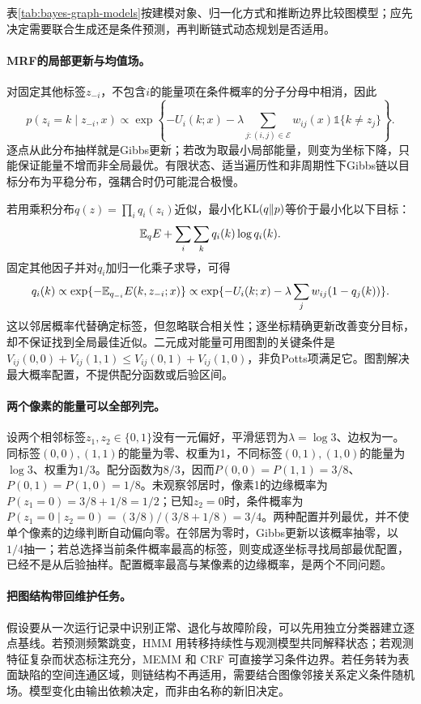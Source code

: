 表\ref{tab:bayes-graph-models}按建模对象、归一化方式和推断边界比较图模型；应先决定需要联合生成还是条件预测，再判断链式动态规划是否适用。
\paragraph{MRF的局部更新与均值场。}
对固定其他标签$z_{-i}$，不包含$i$的能量项在条件概率的分子分母中相消，因此
\begin{equation}
 p(z_i=k\mid z_{-i},x)\propto
 \exp\left\{-U_i(k;x)-\lambda\sum_{j:(i,j)\in\mathcal E}w_{ij}(x)\mathbb 1\{k\ne z_j\}\right\}.
\end{equation}
逐点从此分布抽样就是Gibbs更新；若改为取最小局部能量，则变为坐标下降，只能保证能量不增而非全局最优。有限状态、适当遍历性和非周期性下Gibbs链以目标分布为平稳分布，强耦合时仍可能混合极慢。

若用乘积分布$q(z)=\prod_iq_i(z_i)$近似，最小化$\operatorname{KL}(q\|p)$等价于最小化以下目标：
\begin{equation}
 \mathbb{E}_qE+\sum_i\sum_kq_i(k)\log q_i(k).
\end{equation}
固定其他因子并对$q_i$加归一化乘子求导，可得
\begin{equation}
 q_i(k)\propto\exp\{-\mathbb{E}_{q_{-i}}E(k,z_{-i};x)\}
 \propto\exp\{-U_i(k;x)-\lambda\sum_jw_{ij}(1-q_j(k))\}.
\end{equation}
这以邻居概率代替确定标签，但忽略联合相关性；逐坐标精确更新改善变分目标，却不保证找到全局最佳近似。二元成对能量可用图割的关键条件是$V_{ij}(0,0)+V_{ij}(1,1)\leq V_{ij}(0,1)+V_{ij}(1,0)$，非负Potts项满足它。图割解决最大概率配置，不提供配分函数或后验区间。

\paragraph{两个像素的能量可以全部列完。}
设两个相邻标签$z_1,z_2\in\{0,1\}$没有一元偏好，平滑惩罚为$\lambda=\log3$、边权为一。同标签$(0,0),(1,1)$的能量为零、权重为1，不同标签$(0,1),(1,0)$的能量为$\log3$、权重为$1/3$。配分函数为$8/3$，因而$P(0,0)=P(1,1)=3/8$、$P(0,1)=P(1,0)=1/8$。未观察邻居时，像素1的边缘概率为$P(z_1=0)=3/8+1/8=1/2$；已知$z_2=0$时，条件概率为$P(z_1=0\mid z_2=0)=(3/8)/(3/8+1/8)=3/4$。两种配置并列最优，并不使单个像素的边缘判断自动偏向零。在邻居为零时，Gibbs更新以该概率抽零，以$1/4$抽一；若总选择当前条件概率最高的标签，则变成逐坐标寻找局部最优配置，已经不是从后验抽样。配置概率最高与某像素的边缘概率，是两个不同问题。

\paragraph{把图结构带回维护任务。}
假设要从一次运行记录中识别正常、退化与故障阶段，可以先用独立分类器建立逐点基线。若预测频繁跳变，HMM 用转移持续性与观测模型共同解释状态；若观测特征复杂而状态标注充分，MEMM 和 CRF 可直接学习条件边界。若任务转为表面缺陷的空间连通区域，则链结构不再适用，需要结合图像邻接关系定义条件随机场。模型变化由输出依赖决定，而非由名称的新旧决定。

